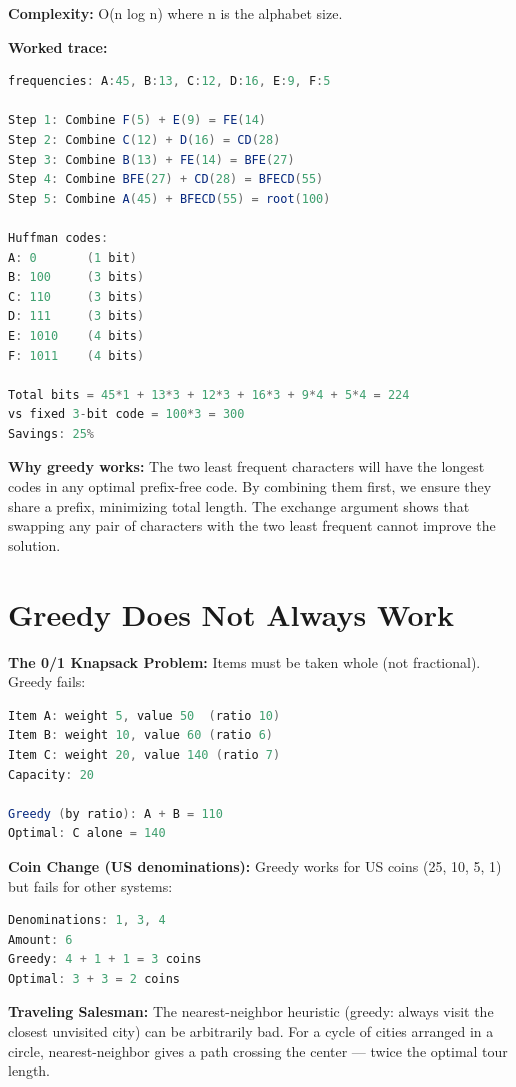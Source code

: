 \textbf{Complexity:} O(n log n) where n is the alphabet size.

\textbf{Worked trace:}
\begin{lstlisting}[language=Java]
frequencies: A:45, B:13, C:12, D:16, E:9, F:5

Step 1: Combine F(5) + E(9) = FE(14)
Step 2: Combine C(12) + D(16) = CD(28)
Step 3: Combine B(13) + FE(14) = BFE(27)
Step 4: Combine BFE(27) + CD(28) = BFECD(55)
Step 5: Combine A(45) + BFECD(55) = root(100)

Huffman codes:
A: 0       (1 bit)
B: 100     (3 bits)
C: 110     (3 bits)
D: 111     (3 bits)
E: 1010    (4 bits)
F: 1011    (4 bits)

Total bits = 45*1 + 13*3 + 12*3 + 16*3 + 9*4 + 5*4 = 224
vs fixed 3-bit code = 100*3 = 300
Savings: 25%
\end{lstlisting}

\textbf{Why greedy works:} The two least frequent characters will have the longest codes in any optimal prefix-free code. By combining them first, we ensure they share a prefix, minimizing total length. The exchange argument shows that swapping any pair of characters with the two least frequent cannot improve the solution.

\section{Greedy Does Not Always Work}

\textbf{The 0/1 Knapsack Problem:} Items must be taken whole (not fractional). Greedy fails:
\begin{lstlisting}[language=Java]
Item A: weight 5, value 50  (ratio 10)
Item B: weight 10, value 60 (ratio 6)
Item C: weight 20, value 140 (ratio 7)
Capacity: 20

Greedy (by ratio): A + B = 110
Optimal: C alone = 140
\end{lstlisting}

\textbf{Coin Change (US denominations):} Greedy works for US coins (25, 10, 5, 1) but fails for other systems:
\begin{lstlisting}[language=Java]
Denominations: 1, 3, 4
Amount: 6
Greedy: 4 + 1 + 1 = 3 coins
Optimal: 3 + 3 = 2 coins
\end{lstlisting}

\textbf{Traveling Salesman:} The nearest-neighbor heuristic (greedy: always visit the closest unvisited city) can be arbitrarily bad. For a cycle of cities arranged in a circle, nearest-neighbor gives a path crossing the center — twice the optimal tour length.

